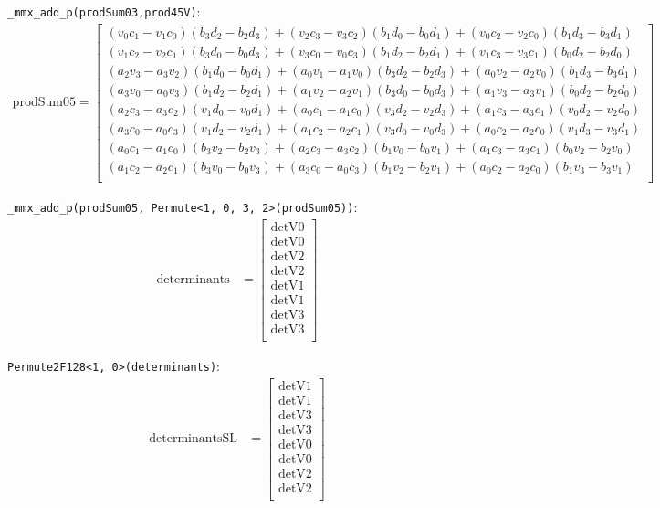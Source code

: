 \documentclass[fontsize = 10pt,DIV = 13]{scrartcl}
\newcommand{\pth}[1]{\left(#1\right)}
\begin{document}
\texttt{_mmx_add_p(prodSum03,prod45V)}:
\begin{align*}
\mathrm{prodSum05} 
=
\begin{bmatrix}
  \pth{v_0c_1 - v_1c_0}\pth{b_3d_2 - b_2d_3} 
+ \pth{v_2c_3 - v_3c_2}\pth{b_1d_0 - b_0d_1}
+ \pth{v_0c_2 - v_2c_0}\pth{b_1d_3 - b_3d_1}\\
  \pth{v_1c_2 - v_2c_1}\pth{b_3d_0 - b_0d_3}
+ \pth{v_3c_0 - v_0c_3}\pth{b_1d_2 - b_2d_1}
+ \pth{v_1c_3 - v_3c_1}\pth{b_0d_2 - b_2d_0}\\
  \pth{a_2v_3 - a_3v_2}\pth{b_1d_0 - b_0d_1}
+ \pth{a_0v_1 - a_1v_0}\pth{b_3d_2 - b_2d_3}
+ \pth{a_0v_2 - a_2v_0}\pth{b_1d_3 - b_3d_1}\\
  \pth{a_3v_0 - a_0v_3}\pth{b_1d_2 - b_2d_1}
+ \pth{a_1v_2 - a_2v_1}\pth{b_3d_0 - b_0d_3}
+ \pth{a_1v_3 - a_3v_1}\pth{b_0d_2 - b_2d_0}\\
  \pth{a_2c_3 - a_3c_2}\pth{v_1d_0 - v_0d_1}
+ \pth{a_0c_1 - a_1c_0}\pth{v_3d_2 - v_2d_3}
+ \pth{a_1c_3 - a_3c_1}\pth{v_0d_2 - v_2d_0}\\
  \pth{a_3c_0 - a_0c_3}\pth{v_1d_2 - v_2d_1}
+ \pth{a_1c_2 - a_2c_1}\pth{v_3d_0 - v_0d_3}
+ \pth{a_0c_2 - a_2c_0}\pth{v_1d_3 - v_3d_1}\\
  \pth{a_0c_1 - a_1c_0}\pth{b_3v_2 - b_2v_3}
+ \pth{a_2c_3 - a_3c_2}\pth{b_1v_0 - b_0v_1}
+ \pth{a_1c_3 - a_3c_1}\pth{b_0v_2 - b_2v_0}\\
  \pth{a_1c_2 - a_2c_1}\pth{b_3v_0 - b_0v_3}
+ \pth{a_3c_0 - a_0c_3}\pth{b_1v_2 - b_2v_1}
+ \pth{a_0c_2 - a_2c_0}\pth{b_1v_3 - b_3v_1}\\
\end{bmatrix}
\end{align*}

\texttt{_mmx_add_p(prodSum05, Permute<1, 0, 3, 2>(prodSum05))}:
\begin{align*}
\mathrm{determinants} 
&=
\begin{bmatrix}
\mathrm{detV0}\\
\mathrm{detV0}\\
\mathrm{detV2}\\
\mathrm{detV2}\\
\mathrm{detV1}\\
\mathrm{detV1}\\
\mathrm{detV3}\\
\mathrm{detV3}\\
\end{bmatrix}
\end{align*}


\texttt{Permute2F128<1, 0>(determinants)}:
\begin{align*}
\mathrm{determinantsSL} 
&=
\begin{bmatrix}
\mathrm{detV1}\\
\mathrm{detV1}\\
\mathrm{detV3}\\
\mathrm{detV3}\\
\mathrm{detV0}\\
\mathrm{detV0}\\
\mathrm{detV2}\\
\mathrm{detV2}\\
\end{bmatrix}
\end{align*}
\end{document}
